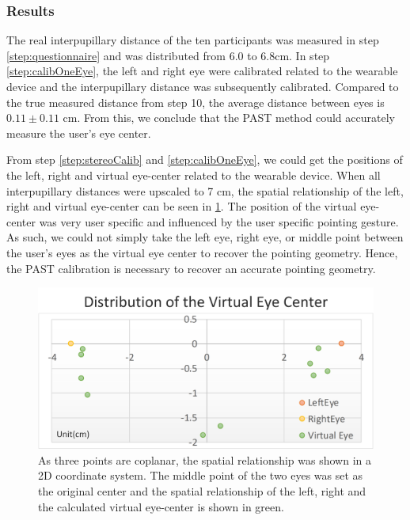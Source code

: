 \subsubsection{Results} \label{sec:4-PAST:results}
The real interpupillary distance of the ten participants was measured in step \ref{step:questionnaire} and was distributed from 6.0 to 6.8cm. In step \ref{step:calibOneEye}, the left and right eye were calibrated related to the wearable device and the interpupillary distance was subsequently calibrated. Compared to the true measured distance from step 10, the average distance between eyes is $0.11\pm0.11$ cm. From this, we conclude that the PAST method could accurately measure the user's eye center. 

From step \ref{step:stereoCalib} and \ref{step:calibOneEye}, we could get the positions of the left, right and virtual eye-center related to the wearable device. When all interpupillary distances were upscaled to 7 cm, the spatial relationship of the left, right and virtual eye-center can be seen in \figurename{ \ref{fig:4-PAST:virtualEye}}. 
The position of the virtual eye-center was very user specific and influenced by the user specific pointing gesture. As such, we could not simply take the left eye, right eye, or middle point between the user's eyes as the virtual eye center to recover the pointing geometry. Hence, the PAST calibration is necessary to recover an accurate pointing geometry.
\begin{figure}[htb] 
	\centering
	\includegraphics[width=\linewidth]{figures/4-PAST/virtualEye.png}
	\caption{As three points are coplanar, the spatial relationship was shown in a 2D coordinate system. The middle point of the two eyes was set as the original center and the spatial relationship of the left, right and the calculated virtual eye-center is shown in green.}
	\label{fig:4-PAST:virtualEye}
\end{figure}

